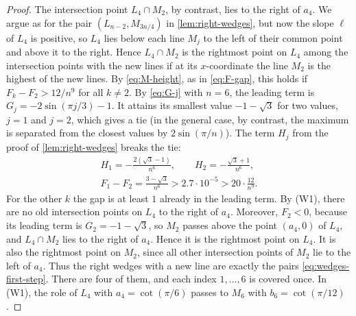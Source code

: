 \begin{proof}
The intersection point $L_4\cap M_2$, by contrast, lies to the right of $a_4$.
We argue as for the pair $(L_{n-2},M_{3n/4})$ in \cref{lem:right-wedges}, but now the slope $\ell$ of $L_4$ is positive, so $L_4$ lies below each line $M_j$ to the left of their common point and above it to the right.
Hence $L_4\cap M_2$ is the rightmost point on $L_4$ among the intersection points with the new lines if at its $x$-coordinate the line $M_2$ is the highest of the new lines. By \eqref{eq:M-height}, as in \eqref{eq:F-gap}, this holds if $F_k-F_2>12/n^9$ for all $k\neq2$.
By \eqref{eq:G-j} with $n=6$, the leading term is $G_j=-2\sin(\pi j/3)-1$. It attains its smallest value $-1-\sqrt3$ for two values, $j=1$ and $j=2$, which gives a tie (in the general case, by contrast, the maximum is separated from the closest values by $2\sin(\pi/n)$).
The term $H_j$ from the proof of \cref{lem:right-wedges} breaks the tie:
\[
\begin{gathered}
H_1=-\frac{2(\sqrt3-1)}{n^6},\qquad H_2=-\frac{\sqrt3+1}{n^6},\\
F_1-F_2=\frac{3-\sqrt3}{n^{6}}>2.7\cdot10^{-5}>20\cdot\frac{12}{n^9}.
\end{gathered}
\]
For the other $k$ the gap is at least $1$ already in the leading term.
By (W1), there are no old intersection points on $L_4$ to the right of $a_4$. Moreover, $F_2<0$, because its leading term is $G_2=-1-\sqrt3$, so $M_2$ passes above the point $(a_4,0)$ of $L_4$, and $L_4\cap M_2$ lies to the right of $a_4$. Hence it is the rightmost point on $L_4$. It is also the rightmost point on $M_2$, since all other intersection points of $M_2$ lie to the left of $a_4$.
Thus the right wedges with a new line are exactly the pairs \eqref{eq:wedges-first-step}. There are four of them, and each index $1,\ldots,6$ is covered once.
In \textup{(W1)}, the role of $L_4$ with $a_4=\cot(\pi/6)$ passes to $M_6$ with $b_6=\cot(\pi/12)$.
\end{proof}
